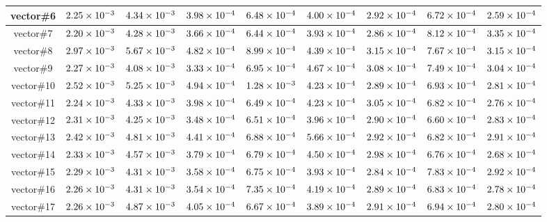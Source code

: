 \documentclass[../main.tex]{subfiles}
\begin{document}
\begin{table}[ht]
\begin{tabular}{|c|c|c|c|c|c|c|c|c|}
    vector\#6  & $\num{2.25E-03}$ & $\num{4.34E-03}$ & $\num{3.98E-04}$ & $\num{6.48E-04}$ & $\num{4.00E-04}$ & $\num{2.92E-04}$ & $\num{6.72E-04}$ & $\num{2.59E-04}$ \\ \hline
    vector\#7  & $\num{2.20E-03}$ & $\num{4.28E-03}$ & $\num{3.66E-04}$ & $\num{6.44E-04}$ & $\num{3.93E-04}$ & $\num{2.86E-04}$ & $\num{8.12E-04}$ & $\num{3.35E-04}$ \\ \hline
    \rowcolor[HTML]{C0C0C0}
    vector\#8  & $\num{2.97E-03}$ & $\num{5.67E-03}$ & $\num{4.82E-04}$ & $\num{8.99E-04}$ & $\num{4.39E-04}$ & $\num{3.15E-04}$ & $\num{7.67E-04}$ & $\num{3.15E-04}$ \\ \hline
    vector\#9  & $\num{2.27E-03}$ & $\num{4.08E-03}$ & $\num{3.33E-04}$ & $\num{6.95E-04}$ & $\num{4.67E-04}$ & $\num{3.08E-04}$ & $\num{7.49E-04}$ & $\num{3.04E-04}$ \\ \hline
    \rowcolor[HTML]{C0C0C0}
    vector\#10 & $\num{2.52E-03}$ & $\num{5.25E-03}$ & $\num{4.94E-04}$ & $\num{1.28E-03}$ & $\num{4.23E-04}$ & $\num{2.89E-04}$ & $\num{6.93E-04}$ & $\num{2.81E-04}$ \\ \hline
    vector\#11 & $\num{2.24E-03}$ & $\num{4.33E-03}$ & $\num{3.98E-04}$ & $\num{6.49E-04}$ & $\num{4.23E-04}$ & $\num{3.05E-04}$ & $\num{6.82E-04}$ & $\num{2.76E-04}$ \\ \hline
    \rowcolor[HTML]{C0C0C0}
    vector\#12 & $\num{2.31E-03}$ & $\num{4.25E-03}$ & $\num{3.48E-04}$ & $\num{6.51E-04}$ & $\num{3.96E-04}$ & $\num{2.90E-04}$ & $\num{6.60E-04}$ & $\num{2.83E-04}$ \\ \hline
    vector\#13 & $\num{2.42E-03}$ & $\num{4.81E-03}$ & $\num{4.41E-04}$ & $\num{6.88E-04}$ & $\num{5.66E-04}$ & $\num{2.92E-04}$ & $\num{6.82E-04}$ & $\num{2.91E-04}$ \\ \hline
    \rowcolor[HTML]{C0C0C0}
    vector\#14 & $\num{2.33E-03}$ & $\num{4.57E-03}$ & $\num{3.79E-04}$ & $\num{6.79E-04}$ & $\num{4.50E-04}$ & $\num{2.98E-04}$ & $\num{6.76E-04}$ & $\num{2.68E-04}$ \\ \hline
    vector\#15 & $\num{2.29E-03}$ & $\num{4.31E-03}$ & $\num{3.58E-04}$ & $\num{6.75E-04}$ & $\num{3.93E-04}$ & $\num{2.84E-04}$ & $\num{7.83E-04}$ & $\num{2.92E-04}$ \\ \hline
    \rowcolor[HTML]{C0C0C0}
    vector\#16 & $\num{2.26E-03}$ & $\num{4.31E-03}$ & $\num{3.54E-04}$ & $\num{7.35E-04}$ & $\num{4.19E-04}$ & $\num{2.89E-04}$ & $\num{6.83E-04}$ & $\num{2.78E-04}$ \\ \hline
    vector\#17 & $\num{2.26E-03}$ & $\num{4.87E-03}$ & $\num{4.05E-04}$ & $\num{6.67E-04}$ & $\num{3.89E-04}$ & $\num{2.91E-04}$ & $\num{6.94E-04}$ & $\num{2.80E-04}$ \\ \hline

\end{tabular}
\end{table}
\end{document}
